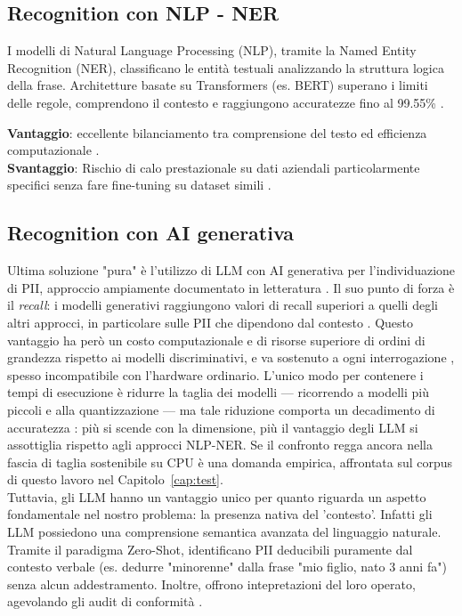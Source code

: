 \subsection{Recognition con NLP - NER}
\label{sub:recognition-ner}
I modelli di Natural Language Processing (NLP), tramite la Named Entity Recognition (NER), classificano le entità testuali analizzando la struttura logica della frase. Architetture basate su Transformers (es. BERT) superano i limiti delle regole, comprendono il contesto \cite{devlinBERTPretrainingDeep2019} e raggiungono accuratezze fino al 99.55\% \cite{PDFDetectingPersonally2026}. \medskip

\textbf{Vantaggio}: eccellente bilanciamento tra comprensione del testo ed efficienza computazionale \cite{luccioni2024energy}.\\
\textbf{Svantaggio}: Rischio di calo prestazionale su dati aziendali particolarmente specifici senza fare fine-tuning su dataset simili \cite{jhaPIIBenchUnifiedMultiSource2026}.

\subsection{Recognition con AI generativa}
\label{sub:recognition-generative-ai}
Ultima soluzione "pura" è l'utilizzo di LLM con AI generativa per l'individuazione di PII, approccio ampiamente documentato in letteratura \cite{yangExploringApplicationLarge2023, jhaPIIBenchUnifiedMultiSource2026}. Il suo punto di forza è il \textit{recall}: i modelli generativi raggiungono valori di recall superiori a quelli degli altri approcci, in particolare sulle PII che dipendono dal contesto \cite{zambranoDeidentifyingStudentPersonally2025, jhaPIIBenchUnifiedMultiSource2026}. Questo vantaggio ha però un costo computazionale e di risorse superiore di ordini di grandezza rispetto ai modelli discriminativi, e va sostenuto a ogni interrogazione \cite{luccioni2024energy, yuOpenClosedSmall2023, husomPricePromptingProfiling2026}, spesso incompatibile con l'hardware ordinario. L'unico modo per contenere i tempi di esecuzione è ridurre la taglia dei modelli --- ricorrendo a modelli più piccoli e alla quantizzazione \cite{lu2024slmsurvey, malakhov2026cpullm} --- ma tale riduzione comporta un decadimento di accuratezza \cite{mobilequant2025}: più si scende con la dimensione, più il vantaggio degli LLM si assottiglia rispetto agli approcci NLP-NER. Se il confronto regga ancora nella fascia di taglia sostenibile su CPU è una domanda empirica, affrontata sul corpus di questo lavoro nel Capitolo~\ref{cap:test}. \\
Tuttavia, gli LLM hanno un vantaggio unico per quanto riguarda un aspetto fondamentale nel nostro problema: la presenza nativa del 'contesto'. Infatti gli LLM possiedono una comprensione semantica avanzata del linguaggio naturale. Tramite il paradigma Zero-Shot, identificano PII deducibili puramente dal contesto verbale (es. dedurre "minorenne" dalla frase "mio figlio, nato 3 anni fa") senza alcun addestramento. Inoltre, offrono intepretazioni del loro operato, agevolando gli audit di conformità \cite{yangExploringApplicationLarge2023}.

